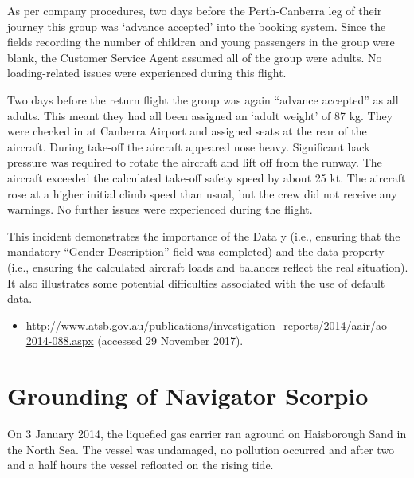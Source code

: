 As per company procedures, two days before the Perth-Canberra leg of their journey this group was `advance accepted' into the booking system. Since the fields recording the number of children and young passengers in the group were blank, the Customer Service Agent assumed all of the group were adults. No loading-related issues were experienced during this flight.

Two days before the return flight the group was again ``advance accepted'' as all adults. This meant they had all been assigned an `adult weight' of 87 kg. They were checked in at Canberra Airport and assigned seats at the rear of the aircraft. During take-off the aircraft appeared nose heavy. Significant back pressure was required to rotate the aircraft and lift off from the runway. The aircraft exceeded the calculated take-off safety speed by about 25 kt. The aircraft rose at a higher initial climb speed than usual, but the crew did not receive any warnings. No further issues were experienced during the flight.

This incident demonstrates the importance of the  Data y (i.e., ensuring that the mandatory ``Gender Description'' field was completed) and the  \gls{data property} (i.e., ensuring the calculated aircraft loads and balances reflect the real situation). It also illustrates some potential difficulties associated with the use of default data.

\begin{samepage}
\begin{itemize}
  \item \raggedright{\href{http://www.atsb.gov.au/publications/investigation_reports/2014/aair/ao-2014-088.aspx}{http://www.atsb.gov.au/publications/investigation\_reports/2014/aair/ao-2014-088.aspx} (accessed 29 November 2017).}
\end{itemize}
\end{samepage}


\section{Grounding of Navigator Scorpio} \label{bkm:incacc:navscor}
On 3 January 2014, the liquefied gas carrier  ran aground on Haisborough Sand in the North Sea. The vessel was undamaged, no pollution occurred and after two and a half hours the vessel refloated on the rising tide.

